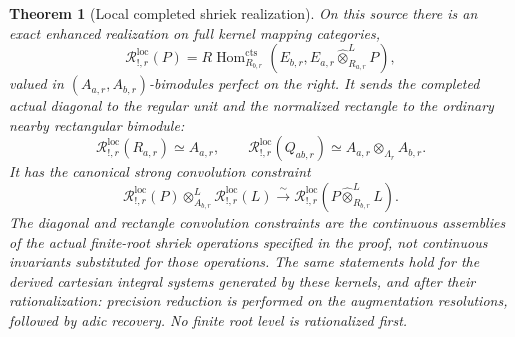\documentclass[11pt]{article}
\newtheorem{theorem}[proposition]{Theorem}
\theoremstyle{definition}
\theoremstyle{remark}
\newcommand{\RHom}{R\operatorname{Hom}}
\begin{document}
\begin{theorem}[Local completed shriek realization]
\label{thm:completed-root-shriek}
On this source there is an exact enhanced realization on full
kernel mapping categories,
\begin{equation}
 \mathcal R_{!,r}^{\mathrm{loc}}(P)
 =\RHom_{R_{b,r}}^{\mathrm{cts}}
       (E_{b,r},E_{a,r}\widehat\otimes_{R_{a,r}}^L P),
 \label{eq:completed-root-realization}
\end{equation}
valued in $(A_{a,r},A_{b,r})$-bimodules perfect on the right.  It
sends the completed actual diagonal to the regular unit and the
normalized rectangle to the ordinary nearby rectangular bimodule:
\[
 \mathcal R_{!,r}^{\mathrm{loc}}(R_{a,r})\simeq A_{a,r},\qquad
 \mathcal R_{!,r}^{\mathrm{loc}}(Q_{ab,r})
       \simeq A_{a,r}\otimes_{\Lambda_r}A_{b,r}.
\]
It has the canonical strong convolution constraint
\[
 \mathcal R_{!,r}^{\mathrm{loc}}(P)\otimes_{A_{b,r}}^L
 \mathcal R_{!,r}^{\mathrm{loc}}(L)
   \xrightarrow{\sim}\mathcal R_{!,r}^{\mathrm{loc}}
                              (P\widehat\otimes_{R_{b,r}}^L L).
\]
The diagonal and rectangle convolution constraints are the
continuous assemblies of the actual finite-root shriek operations
specified in the proof, not continuous invariants substituted for
those operations.
The same statements hold for the derived cartesian integral systems
generated by these kernels, and after their rationalization: precision
reduction is performed on the augmentation resolutions, followed by
adic recovery.  No finite root level is rationalized first.
\end{theorem}
\end{document}
